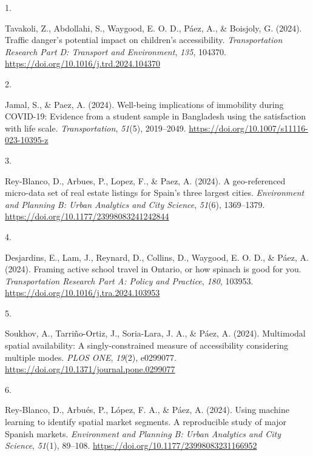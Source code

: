 \documentclass[11pt,a4paper,]{awesome-cv}
\newlength{\cslhangindent}
\newlength{\csllabelwidth}
\newenvironment{CSLReferences}[2] %
 {\begin{list}{}{%
  \setlength{\itemindent}{0pt}
  \setlength{\leftmargin}{0pt}
  \setlength{\parsep}{0pt}
  \ifodd #1
   \setlength{\leftmargin}{\cslhangindent}
   \setlength{\itemindent}{-1\cslhangindent}
  \fi
  \setlength{\itemsep}{#2\baselineskip}}}
 {\end{list}}
\newcommand{\CSLLeftMargin}[1]{\parbox[t]{\csllabelwidth}{\strut#1\strut}}
\newcommand{\CSLRightInline}[1]{\parbox[t]{\linewidth - \csllabelwidth}{\strut#1\strut}}
\begin{document}
\label{refs-7f2a2b0ccdb42055bd8a489a90181671}
\begin{CSLReferences}{0}{0}
\CSLLeftMargin{1. }%
\CSLRightInline{Tavakoli, Z., Abdollahi, S., Waygood, E. O. D., Páez,
A., \& Boisjoly, G. (2024). Traffic danger's potential impact on
children's accessibility. \emph{Transportation Research Part D:
Transport and Environment}, \emph{135}, 104370.
\url{https://doi.org/10.1016/j.trd.2024.104370}}

\CSLLeftMargin{2. }%
\CSLRightInline{Jamal, S., \& Paez, A. (2024). Well-being implications
of immobility during COVID-19: Evidence from a student sample in
Bangladesh using the satisfaction with life scale.
\emph{Transportation}, \emph{51}(5), 2019--2049.
\url{https://doi.org/10.1007/s11116-023-10395-z}}

\CSLLeftMargin{3. }%
\CSLRightInline{Rey-Blanco, D., Arbues, P., Lopez, F., \& Paez, A.
(2024). A geo-referenced micro-data set of real estate listings for
Spain's three largest cities. \emph{Environment and Planning B: Urban
Analytics and City Science}, \emph{51}(6), 1369--1379.
\url{https://doi.org/10.1177/23998083241242844}}

\CSLLeftMargin{4. }%
\CSLRightInline{Desjardins, E., Lam, J., Reynard, D., Collins, D.,
Waygood, E. O. D., \& Páez, A. (2024). Framing active school travel in
Ontario, or how spinach is good for you. \emph{Transportation Research
Part A: Policy and Practice}, \emph{180}, 103953.
\url{https://doi.org/10.1016/j.tra.2024.103953}}

\CSLLeftMargin{5. }%
\CSLRightInline{Soukhov, A., Tarriño-Ortiz, J., Soria-Lara, J. A., \&
Páez, A. (2024). Multimodal spatial availability: A singly-constrained
measure of accessibility considering multiple modes. \emph{PLOS ONE},
\emph{19}(2), e0299077.
\url{https://doi.org/10.1371/journal.pone.0299077}}

\CSLLeftMargin{6. }%
\CSLRightInline{Rey-Blanco, D., Arbués, P., López, F. A., \& Páez, A.
(2024). Using machine learning to identify spatial market segments. A
reproducible study of major Spanish markets. \emph{Environment and
Planning B: Urban Analytics and City Science}, \emph{51}(1), 89--108.
\url{https://doi.org/10.1177/23998083231166952}}


\end{CSLReferences}
\end{document}
